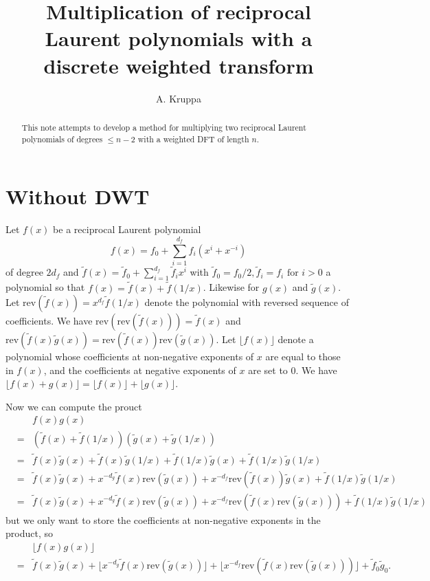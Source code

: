 \documentclass{article}
\begin{document}
\newcommand{\Z}{\mathbb{Z}}
\newcommand{\Zn}[1]{(\Z/{#1}\Z)^{*}}
\newcommand{\tf}{\tilde{f}}
\newcommand{\tg}{\tilde{g}}
\newcommand{\rev}{\textrm{rev}}

\title{Multiplication of reciprocal Laurent polynomials with a discrete 
       weighted transform}
\author{A. Kruppa}
\maketitle

\begin{abstract}
This note attempts to develop a method for multiplying two reciprocal
Laurent polynomials of degrees $\leq n - 2$ with a weighted DFT of 
length $n$.
\end{abstract}

\section{Without DWT}

Let $f(x)$ be a reciprocal Laurent polynomial
\begin{displaymath}
f(x) = f_0 + \sum_{i=1}^{d_f} f_i (x^i + x^{-i})
\end{displaymath}
of degree $2d_f$ and $\tf(x) = \tf_0 + \sum_{i=1}^{d_f} \tf_i x^i$ with
$\tf_0 = f_0 / 2, \tf_i = f_i \textrm{ for } i>0$ a polynomial so that
$f(x) = \tf(x) + \tf(1/x)$. Likewise for $g(x)$ and $\tg(x)$.
Let $\rev(\tf(x)) = x^{d_f} \tf(1/x)$ denote the polynomial with 
reversed sequence of coefficients. We have $\rev(\rev(\tf(x))) = \tf(x)$ and
$\rev(\tf(x) \tg(x)) = \rev(\tf(x)) \rev(\tg(x))$.
Let $\lfloor f(x) \rfloor$ denote a 
polynomial whose coefficients at non-negative exponents of $x$ are equal to 
those in $f(x)$, and the coefficients at negative exponents of $x$ are 
set to $0$. We have 
$\lfloor f(x) + g(x) \rfloor = \lfloor f(x) \rfloor + \lfloor g(x) \rfloor$.

Now we can compute the prouct
\begin{eqnarray*}
   &   & f(x)g(x) \\
   & = & (\tf(x) + \tf(1/x)) (\tg(x) + \tg(1/x)) \\
   & = & \tf(x) \tg(x) + \tf(x) \tg(1/x) + \tf(1/x)\tg(x) + \tf(1/x)\tg(1/x) \\
   & = & \tf(x) \tg(x) + x^{-d_g} \tf(x) \rev(\tg(x)) + x^{-d_f} \rev(\tf(x))\tg(x) + \tf(1/x)\tg(1/x) \\
   & = & \tf(x) \tg(x) + x^{-d_g} \tf(x) \rev(\tg(x)) + x^{-d_f} \rev(\tf(x) \rev(\tg(x))) + \tf(1/x)\tg(1/x)
\end{eqnarray*}
but we only want to store the coefficients at non-negative exponents in the 
product, so
\begin{eqnarray*}
   &   & \lfloor f(x)g(x) \rfloor \\
   & = & \tf(x) \tg(x) + \lfloor x^{-d_g} \tf(x) \rev(\tg(x)) \rfloor + \lfloor x^{-d_f} \rev(\tf(x) \rev(\tg(x))) \rfloor + \tf_0 \tg_0.
\end{eqnarray*}
\end{document}
